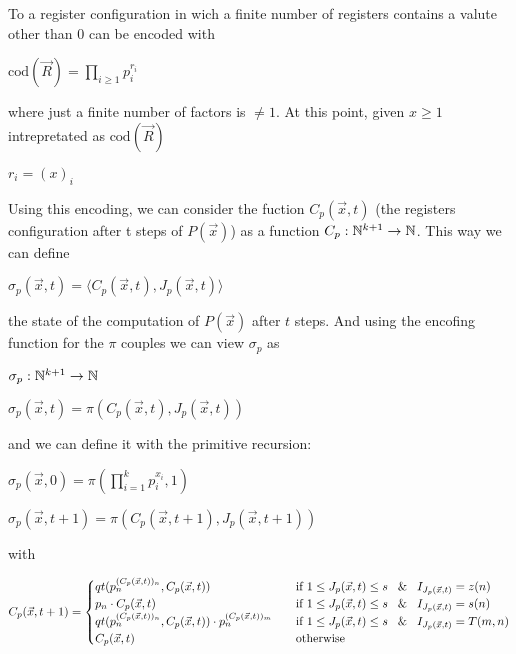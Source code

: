 To a register configuration  in wich a finite number of registers contains a valute other than 0 can be encoded with 

\begin{center}
$\text{cod}(\vec{R}) = \prod\limits_{i \geq 1}p_i^{r_i}$     
\end{center}

where just a finite number of factors is $\neq 1$. At this point, given $x \geq 1$ intrepretated as $\text{cod}(\vec{R})$

\begin{center}
$r_i = (x)_i$
\end{center}

Using this encoding, we can consider the fuction $C_p(\vec{x},t)$ (the registers configuration after t steps of $P(\vec{x})$) as a function $C_p : \mathbb{N}^{k+1} \rightarrow \mathbb{N}$. This way we can define 

\begin{center}
$\sigma_p(\vec{x},t) = \langle C_p(\vec{x},t), J_p(\vec{x},t) \rangle$
\end{center}

the state of the computation of $P(\vec{x})$ after $t$ steps. And using the encofing function for the $\pi$ couples we can view $\sigma_p$ as

$\sigma_p : \mathbb{N}^{k+1} \rightarrow \mathbb{N}$

$\sigma_p(\vec{x}, t) = \pi(C_p(\vec{x},t), J_p(\vec{x},t))$

and we can define it with the primitive recursion:

$\sigma_p(\vec{x}, 0) = \pi(\prod\limits_{i=1}^k p_i^{x_i}, 1)$

$\sigma_p(\vec{x}, t+1) = \pi(C_p(\vec{x},t+1), J_p(\vec{x},t+1))$

with

\[
C_p(\vec{x},t+1) = \begin{cases}
qt(p_n^{(C_p(\vec{x},t))_n}, C_p(\vec{x},t)) & \quad \text{if }1 \leq J_p(\vec{x},t) \leq s \; \And \; I_{J_p(\vec{x},t)} = z(n) \\
p_n \cdot C_p(\vec{x},t) & \quad \text{if }1 \leq J_p(\vec{x},t) \leq s \; \And \; I_{J_p(\vec{x},t)} = s(n) \\
qt(p_n^{(C_p(\vec{x},t))_n}, C_p(\vec{x},t)) \cdot p_n^{(C_p(\vec{x},t))_m} & \quad \text{if }1 \leq J_p(\vec{x},t) \leq s \; \And \; I_{J_p(\vec{x},t)} = T(m,n) \\
C_p(\vec{x}, t) & \quad \text{otherwise}
\end{cases}
\]

